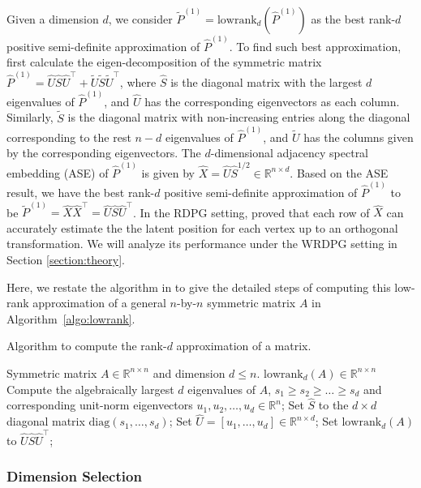 \documentclass[a4paper]{article}
\renewcommand{\hat}{\widehat}
\renewcommand{\tilde}{\widetilde}
\begin{document}
Given a dimension $d$, we consider $\widetilde{P}^{(1)} = \mathrm{lowrank}_d(\hat{P}^{(1)})$ as the best rank-$d$ positive semi-definite approximation of $\hat{P}^{(1)}$. To find such best approximation, first calculate the eigen-decomposition of the symmetric matrix $\hat{P}^{(1)} = \hat{U} \hat{S} \hat{U}^{\top} + \widetilde{U} \widetilde{S} \widetilde{U}^{\top}$, where $\hat{S}$ is the diagonal matrix with the largest $d$ eigenvalues of $\hat{P}^{(1)}$, and $\hat{U}$ has the corresponding eigenvectors as each column. Similarly, $\tilde{S}$ is the diagonal matrix with non-increasing entries along the diagonal corresponding to the rest $n - d$ eigenvalues of $\hat{P}^{(1)}$, and $\tilde{U}$ has the columns given by the corresponding eigenvectors.
The $d$-dimensional adjacency spectral embedding (ASE) of $\hat{P}^{(1)}$ is given by $\hat{X}=\hat{U} \hat{S}^{1/2}\in \mathbb{R}^{n \times d}$.
Based on the ASE result, we have the best rank-$d$ positive semi-definite approximation of $\hat{P}^{(1)}$ to be $\widetilde{P}^{(1)} = \hat{X} \hat{X}^{\top}=\hat{U}\hat{S}\hat{U}^{\top}$.
In the RDPG setting, \citet{sussman2014consistent} proved that each row of $\hat{X}$ can accurately estimate the the latent position for each vertex up to an orthogonal transformation. We will analyze its performance under the WRDPG setting in Section \ref{section:theory}.

Here, we restate the algorithm in \citep{tang2016law} to give the detailed steps of computing this low-rank approximation of a general $n$-by-$n$ symmetric matrix $A$ in Algorithm~\ref{algo:lowrank}.
\begin{algorithm}[H]
\caption{Algorithm to compute the rank-$d$ approximation of a matrix.}
\label{algo:lowrank}
\begin{algorithmic}[1]
\REQUIRE Symmetric matrix $A\in \mathbb{R}^{n \times n}$ and dimension $d\leq n$.
\ENSURE $\mathrm{lowrank}_d(A)\in \mathbb{R}^{n \times n}$
\STATE Compute the algebraically largest $d$ eigenvalues of $A$, $s_1\geq s_2\ge \dotsc \ge s_d$ and corresponding unit-norm eigenvectors $u_1,u_2,\dotsc,u_d\in \mathbb{R}^n$;
\STATE Set $\hat{S}$ to the $d\times d$ diagonal matrix $\mathrm{diag}(s_1,\dotsc,s_d)$;
\STATE Set $\hat{U} = [u_1,\dotsc,u_d]\in \mathbb{R}^{n \times d}$;
\STATE Set $\mathrm{lowrank}_d(A)$ to $\hat{U}\hat{S}\hat{U}^{\top}$;
\end{algorithmic}
\end{algorithm}


\subsubsection{Dimension Selection}
\label{section:dim_select}
\end{document}
